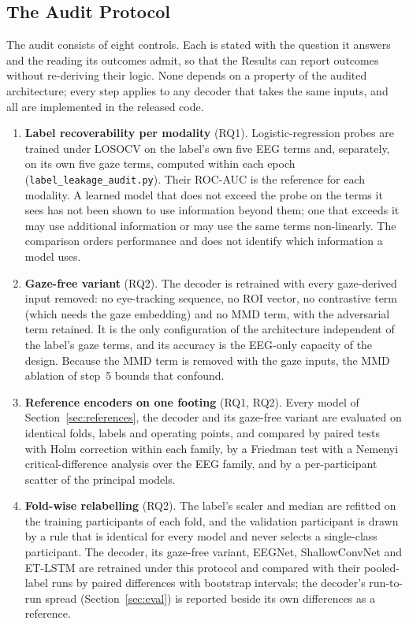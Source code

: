 \subsection{The Audit Protocol}\label{sec:audit}

The audit consists of eight controls. Each is stated with the question it answers and the reading its outcomes admit, so that the Results can report outcomes without re-deriving their logic. None depends on a property of the audited architecture; every step applies to any decoder that takes the same inputs, and all are implemented in the released code.

\begin{enumerate}
\item \textbf{Label recoverability per modality} (RQ1). Logistic-regression probes are trained under LOSOCV on the label's own five EEG terms and, separately, on its own five gaze terms, computed within each epoch (\texttt{label\_leakage\_audit.py}). Their ROC-AUC is the reference for each modality. A learned model that does not exceed the probe on the terms it sees has not been shown to use information beyond them; one that exceeds it may use additional information or may use the same terms non-linearly. The comparison orders performance and does not identify which information a model uses.
\item \textbf{Gaze-free variant} (RQ2). The decoder is retrained with every gaze-derived input removed: no eye-tracking sequence, no ROI vector, no contrastive term (which needs the gaze embedding) and no MMD term, with the adversarial term retained. It is the only configuration of the architecture independent of the label's gaze terms, and its accuracy is the EEG-only capacity of the design. Because the MMD term is removed with the gaze inputs, the MMD ablation of step~5 bounds that confound.
\item \textbf{Reference encoders on one footing} (RQ1, RQ2). Every model of Section~\ref{sec:references}, the decoder and its gaze-free variant are evaluated on identical folds, labels and operating points, and compared by paired tests with Holm correction within each family, by a Friedman test with a Nemenyi critical-difference analysis over the EEG family, and by a per-participant scatter of the principal models.
\item \textbf{Fold-wise relabelling} (RQ2). The label's scaler and median are refitted on the training participants of each fold, and the validation participant is drawn by a rule that is identical for every model and never selects a single-class participant. The decoder, its gaze-free variant, EEGNet, ShallowConvNet and ET-LSTM are retrained under this protocol and compared with their pooled-label runs by paired differences with bootstrap intervals; the decoder's run-to-run spread (Section~\ref{sec:eval}) is reported beside its own differences as a reference.

\end{enumerate}
